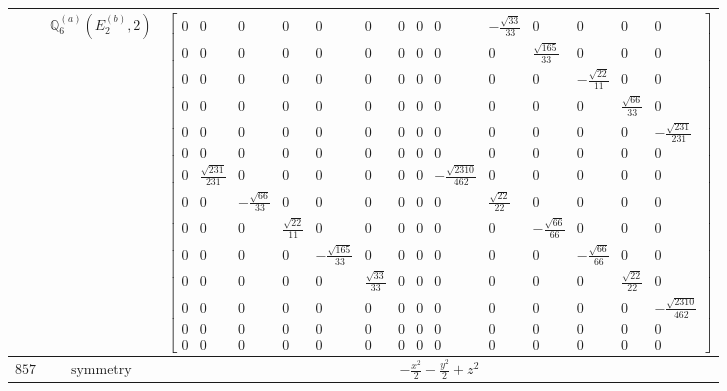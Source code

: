 \documentclass[fleqn,8pt,landscape]{jsarticle}
\begin{document}
\begin{longtable}{ccc}
$  $ & $ \mathbb{Q}_{6}^{(a)}(E_{2}^{(b)},2) $ & $ \begin{bmatrix} 0 & 0 & 0 & 0 & 0 & 0 & 0 & 0 & 0 & - \frac{\sqrt{33}}{33} & 0 & 0 & 0 & 0 \\ 0 & 0 & 0 & 0 & 0 & 0 & 0 & 0 & 0 & 0 & \frac{\sqrt{165}}{33} & 0 & 0 & 0 \\ 0 & 0 & 0 & 0 & 0 & 0 & 0 & 0 & 0 & 0 & 0 & - \frac{\sqrt{22}}{11} & 0 & 0 \\ 0 & 0 & 0 & 0 & 0 & 0 & 0 & 0 & 0 & 0 & 0 & 0 & \frac{\sqrt{66}}{33} & 0 \\ 0 & 0 & 0 & 0 & 0 & 0 & 0 & 0 & 0 & 0 & 0 & 0 & 0 & - \frac{\sqrt{231}}{231} \\ 0 & 0 & 0 & 0 & 0 & 0 & 0 & 0 & 0 & 0 & 0 & 0 & 0 & 0 \\ 0 & \frac{\sqrt{231}}{231} & 0 & 0 & 0 & 0 & 0 & 0 & - \frac{\sqrt{2310}}{462} & 0 & 0 & 0 & 0 & 0 \\ 0 & 0 & - \frac{\sqrt{66}}{33} & 0 & 0 & 0 & 0 & 0 & 0 & \frac{\sqrt{22}}{22} & 0 & 0 & 0 & 0 \\ 0 & 0 & 0 & \frac{\sqrt{22}}{11} & 0 & 0 & 0 & 0 & 0 & 0 & - \frac{\sqrt{66}}{66} & 0 & 0 & 0 \\ 0 & 0 & 0 & 0 & - \frac{\sqrt{165}}{33} & 0 & 0 & 0 & 0 & 0 & 0 & - \frac{\sqrt{66}}{66} & 0 & 0 \\ 0 & 0 & 0 & 0 & 0 & \frac{\sqrt{33}}{33} & 0 & 0 & 0 & 0 & 0 & 0 & \frac{\sqrt{22}}{22} & 0 \\ 0 & 0 & 0 & 0 & 0 & 0 & 0 & 0 & 0 & 0 & 0 & 0 & 0 & - \frac{\sqrt{2310}}{462} \\ 0 & 0 & 0 & 0 & 0 & 0 & 0 & 0 & 0 & 0 & 0 & 0 & 0 & 0 \\ 0 & 0 & 0 & 0 & 0 & 0 & 0 & 0 & 0 & 0 & 0 & 0 & 0 & 0 \end{bmatrix} $ \\ \hline
$ 857 $ & $ \text{symmetry} $ & $ - \frac{x^{2}}{2} - \frac{y^{2}}{2} + z^{2} $ \\

\end{longtable}
\end{document}
